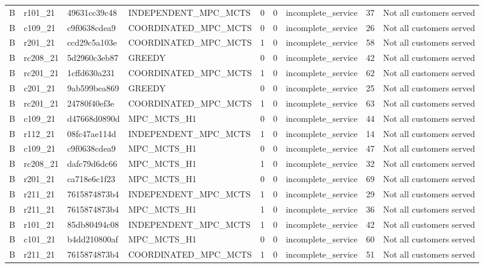 \begin{table}
{\begin{tabular}{llllrrlrl}
B & r101\_21 & 49631cc39c48 & INDEPENDENT\_MPC\_MCTS & 0 & 0 & incomplete\_service & 37 & Not all customers served \\
B & c109\_21 & c9f0638cdea9 & COORDINATED\_MPC\_MCTS & 0 & 0 & incomplete\_service & 26 & Not all customers served \\
B & r201\_21 & ccd29c5a103e & COORDINATED\_MPC\_MCTS & 1 & 0 & incomplete\_service & 58 & Not all customers served \\
B & rc208\_21 & 5d2960c3eb87 & GREEDY & 0 & 0 & incomplete\_service & 42 & Not all customers served \\
B & rc201\_21 & 1cffd630a231 & COORDINATED\_MPC\_MCTS & 1 & 0 & incomplete\_service & 62 & Not all customers served \\
B & c201\_21 & 9ab599bea869 & GREEDY & 0 & 0 & incomplete\_service & 25 & Not all customers served \\
B & rc201\_21 & 24780f40ef3e & COORDINATED\_MPC\_MCTS & 1 & 0 & incomplete\_service & 63 & Not all customers served \\
B & c109\_21 & d47668d0890d & MPC\_MCTS\_H1 & 0 & 0 & incomplete\_service & 44 & Not all customers served \\
B & r112\_21 & 08fc47ae114d & INDEPENDENT\_MPC\_MCTS & 1 & 0 & incomplete\_service & 14 & Not all customers served \\
B & c109\_21 & c9f0638cdea9 & MPC\_MCTS\_H1 & 0 & 0 & incomplete\_service & 47 & Not all customers served \\
B & rc208\_21 & dafc79d6dc66 & MPC\_MCTS\_H1 & 1 & 0 & incomplete\_service & 32 & Not all customers served \\
B & r201\_21 & ca718e6c1f23 & MPC\_MCTS\_H1 & 0 & 0 & incomplete\_service & 69 & Not all customers served \\
B & r211\_21 & 7615874873b4 & INDEPENDENT\_MPC\_MCTS & 1 & 0 & incomplete\_service & 29 & Not all customers served \\
B & r211\_21 & 7615874873b4 & MPC\_MCTS\_H1 & 1 & 0 & incomplete\_service & 36 & Not all customers served \\
B & r101\_21 & 85db80494c08 & INDEPENDENT\_MPC\_MCTS & 1 & 0 & incomplete\_service & 42 & Not all customers served \\
B & c101\_21 & b4dd210800af & MPC\_MCTS\_H1 & 0 & 0 & incomplete\_service & 60 & Not all customers served \\
B & r211\_21 & 7615874873b4 & COORDINATED\_MPC\_MCTS & 1 & 0 & incomplete\_service & 51 & Not all customers served \\

\end{tabular}}
\end{table}
